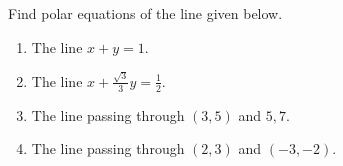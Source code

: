 Find polar equations of the line given below.

\begin{enumerate}
\item The line $x+y=1$.
\item The line $ x+\frac{\sqrt{3}}{3}y=\frac{1}{2}$.
\item The line passing through $(3,5)$ and $5,7$.
\item The line passing through $(2,3)$ and $(-3,-2)$.
\end{enumerate}
